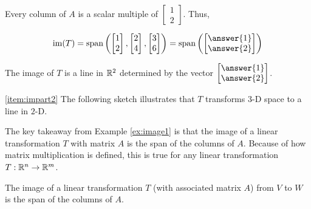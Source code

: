 \documentclass{ximera}
\begin{document}
\begin{example}
\begin{explanation}
Every column of $A$ is a scalar multiple of $\begin{bmatrix}1\\2\end{bmatrix}$.  Thus,
 
$$\mbox{im}(T)=\mbox{span}\left(\begin{bmatrix}1\\2\end{bmatrix}, \begin{bmatrix}2\\4\end{bmatrix}, \begin{bmatrix}3\\6\end{bmatrix}\right)=\mbox{span}\left(\begin{bmatrix}\answer{1}\\\answer{2}\end{bmatrix}\right)$$
 
The image of $T$ is a line in $\mathbb{R}^2$ determined by the vector $\begin{bmatrix}\answer{1}\\\answer{2}\end{bmatrix}$.
 
\ref{item:impart2} The following sketch illustrates that $T$ transforms $3$-D space to a line in $2$-D.
 
\begin{center}
\end{center}
\end{explanation}
\end{example}
 
 
The key takeaway from Example \ref{ex:image1} is that the image of a linear transformation $T$ with matrix $A$ is the span of the columns of $A$.  Because of how matrix multiplication is defined, this is true for any linear transformation $T:\mathbb{R}^n\rightarrow \mathbb{R}^m$.

\begin{theorem}
  The image of a linear transformation $T$ (with associated matrix $A$) from $V$ to $W$ is the span of the columns of $A$.
\end{theorem}
\end{document}
